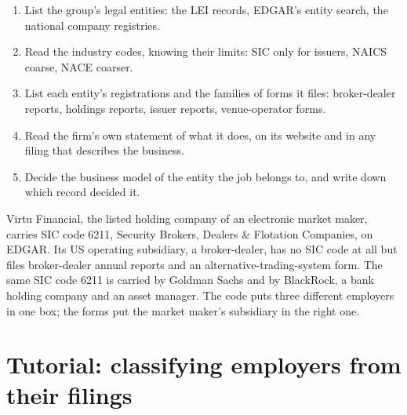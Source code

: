 \begin{method}\label{met:in:a-map-of-the-industry:place}
\begin{enumerate}
\item List the group's legal entities: the LEI records, EDGAR's entity search, the national company registries.
\item Read the industry codes, knowing their limits: SIC only for issuers, NAICS coarse, NACE coarser.
\item List each entity's registrations and the families of forms it files: broker-dealer reports, holdings reports,
issuer reports, venue-operator forms.
\item Read the firm's own statement of what it does, on its website and in any filing that describes the business.
\item Decide the business model of the entity the job belongs to, and write down which record decided it.
\end{enumerate}
\end{method}

\begin{example}\label{ex:in:a-map-of-the-industry:codes}
Virtu Financial, the listed holding company of an electronic market maker, carries SIC code 6211, Security Brokers,
Dealers \& Flotation Companies, on EDGAR. Its US operating subsidiary, a broker-dealer, has no SIC code at all but files
broker-dealer annual reports and an alternative-trading-system form. The same SIC code 6211 is carried by Goldman Sachs
and by BlackRock, a bank holding company and an asset manager. The code puts three different employers in one box; the
forms put the market maker's subsidiary in the right one.
\end{example}

\section{Tutorial: classifying employers from their filings}\label{tut:in:a-map-of-the-industry:tut}

